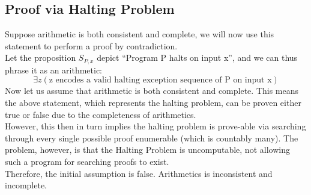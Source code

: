 \subsection{Proof via Halting Problem}
Suppose arithmetic is both consistent and complete, we will now use this statement to perform a proof by contradiction. \\
Let the proposition $S_{P,x}$ depict ``Program P halts on input x'', and we can thus phrase it as an arithmetic:
\[\exists z (\text{z encodes a valid halting exception sequence of P on input x})\]
Now let us assume that arithmetic is both consistent and complete. This means the above statement, which represents the halting problem, can be proven either true or false due to the completeness of arithmetics. \\
However, this then in turn implies the halting problem is prove-able via searching through every single possible proof enumerable (which is countably many). The problem, however, is that the Halting Problem is uncomputable, not allowing such a program for searching proofs to exist. \\
Therefore, the initial assumption is false. Arithmetics is inconsistent and incomplete.
